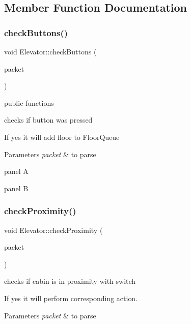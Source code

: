 \subsection{Member Function Documentation}
\mbox{\label{classElevator_afb7850243e1ef5093ecbe71c36fc2d77}} 
\subsubsection{\texorpdfstring{check\+Buttons()}{checkButtons()}}
{\footnotesize\ttfamily void Elevator\+::check\+Buttons (\begin{DoxyParamCaption}\item[{\hyperlink{structpacket__t}{packet\+\_\+t} $\ast$}]{packet }\end{DoxyParamCaption})}



public functions 

checks if button was pressed

If yes it will add floor to Floor\+Queue


\begin{DoxyParams}{Parameters}
{\em packet} & to parse \\
\hline
\end{DoxyParams}
panel A

panel B \mbox{\label{classElevator_aa038b1485887ac34764de0b7e004f6be}} 
\subsubsection{\texorpdfstring{check\+Proximity()}{checkProximity()}}
{\footnotesize\ttfamily void Elevator\+::check\+Proximity (\begin{DoxyParamCaption}\item[{\hyperlink{structpacket__t}{packet\+\_\+t} $\ast$}]{packet }\end{DoxyParamCaption})}



checks if cabin is in proximity with switch 

If yes it will perform corresponding action.


\begin{DoxyParams}{Parameters}
{\em packet} & to parse \\
\hline
\end{DoxyParams}
\mbox{\label{classElevator_abf9b96671aa49352be11ea2a33dcccb5}} 

